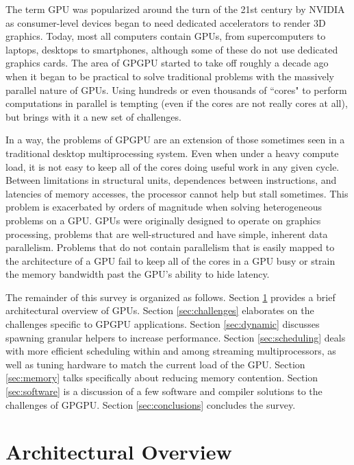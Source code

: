 \documentclass[prodmode,acmtecs]{acmsmall} %
\begin{document}
The term GPU was popularized around the turn of the 21st century by NVIDIA as
consumer-level devices began to need dedicated accelerators to render 3D
graphics. Today, most all computers contain GPUs, from supercomputers to
laptops, desktops to smartphones, although some of these do not use dedicated
graphics cards. The area of GPGPU started to take off roughly a decade ago when
it began to be practical to solve traditional problems with the massively
parallel nature of GPUs. Using hundreds or even thousands of ``cores" to perform
computations in parallel is tempting (even if the cores are not really cores at
all), but brings with it a new set of challenges.

In a way, the problems of GPGPU are an extension of those sometimes seen in a
traditional desktop multiprocessing system. Even when under a heavy compute
load, it is not easy to keep all of the cores doing useful work in any given
cycle. Between limitations in structural units, dependences between
instructions, and latencies of memory accesses, the processor cannot help but
stall sometimes. This problem is exacerbated by orders of magnitude when solving
heterogeneous problems on a GPU. GPUs were originally designed to operate on
graphics processing, problems that are well-structured and have simple, inherent
data parallelism. Problems that do not contain parallelism that is easily mapped
to the architecture of a GPU fail to keep all of the cores in a GPU busy or
strain the memory bandwidth past the GPU's ability to hide latency.

The remainder of this survey is organized as follows. Section
\ref{sec:architecture} provides a brief architectural overview of GPUs. Section
\ref{sec:challenges} elaborates on the challenges specific to GPGPU
applications. Section \ref{sec:dynamic} discusses spawning granular helpers to
increase performance. Section \ref{sec:scheduling} deals with more efficient
scheduling within and among streaming multiprocessors, as well as tuning
hardware to match the current load of the GPU. Section \ref{sec:memory} talks
specifically about reducing memory contention. Section \ref{sec:software} is a
discussion of a few software and compiler solutions to the challenges of GPGPU.
Section
\ref{sec:conclusions} concludes the survey.

\section{Architectural Overview} \label{sec:architecture}
\end{document}
